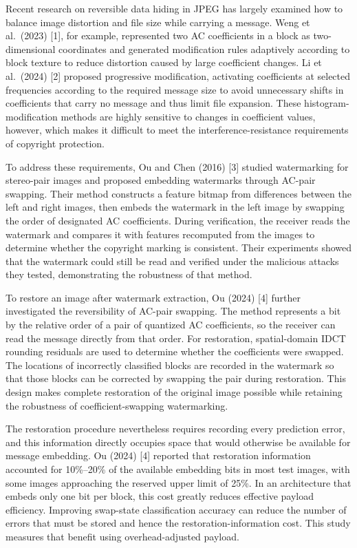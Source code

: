 \documentclass[
  11pt,
  a4paper,
]{article}
\begin{document}
Recent research on reversible data hiding in JPEG has largely examined
how to balance image distortion and file size while carrying a message.
Weng et al.~(2023) {[}1{]}, for example, represented two AC coefficients
in a block as two-dimensional coordinates and generated modification
rules adaptively according to block texture to reduce distortion caused
by large coefficient changes. Li et al.~(2024) {[}2{]} proposed
progressive modification, activating coefficients at selected
frequencies according to the required message size to avoid unnecessary
shifts in coefficients that carry no message and thus limit file
expansion. These histogram-modification methods are highly sensitive to
changes in coefficient values, however, which makes it difficult to meet
the interference-resistance requirements of copyright protection.

To address these requirements, Ou and Chen (2016) {[}3{]} studied
watermarking for stereo-pair images and proposed embedding watermarks
through AC-pair swapping. Their method constructs a feature bitmap from
differences between the left and right images, then embeds the watermark
in the left image by swapping the order of designated AC coefficients.
During verification, the receiver reads the watermark and compares it
with features recomputed from the images to determine whether the
copyright marking is consistent. Their experiments showed that the
watermark could still be read and verified under the malicious attacks
they tested, demonstrating the robustness of that method.

To restore an image after watermark extraction, Ou (2024) {[}4{]}
further investigated the reversibility of AC-pair swapping. The method
represents a bit by the relative order of a pair of quantized AC
coefficients, so the receiver can read the message directly from that
order. For restoration, spatial-domain IDCT rounding residuals are used
to determine whether the coefficients were swapped. The locations of
incorrectly classified blocks are recorded in the watermark so that
those blocks can be corrected by swapping the pair during restoration.
This design makes complete restoration of the original image possible
while retaining the robustness of coefficient-swapping watermarking.

The restoration procedure nevertheless requires recording every
prediction error, and this information directly occupies space that
would otherwise be available for message embedding. Ou (2024) {[}4{]}
reported that restoration information accounted for 10\%--20\% of the
available embedding bits in most test images, with some images
approaching the reserved upper limit of 25\%. In an architecture that
embeds only one bit per block, this cost greatly reduces effective
payload efficiency. Improving swap-state classification accuracy can
reduce the number of errors that must be stored and hence the
restoration-information cost. This study measures that benefit using
overhead-adjusted payload.
\end{document}
